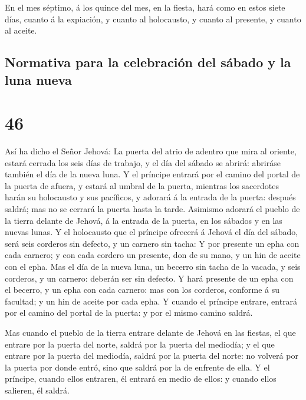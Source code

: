  En el mes séptimo, á los quince del mes, en la fiesta,
hará como en estos siete días, cuanto á la expiación, y cuanto al
holocausto, y cuanto al presente, y cuanto al aceite.

\hypertarget{normativa-para-la-celebraciuxf3n-del-suxe1bado-y-la-luna-nueva}{%
\subsection{Normativa para la celebración del sábado y la luna
nueva}\label{normativa-para-la-celebraciuxf3n-del-suxe1bado-y-la-luna-nueva}}

\hypertarget{section-26-46}{%
\section{46}\label{section-26-46}}

 Así ha dicho el Señor Jehová: La puerta del atrio de
adentro que mira al oriente, estará cerrada los seis días de trabajo, y
el día del sábado se abrirá: abriráse también el día de la nueva luna.
 Y el príncipe entrará por el camino del portal de la
puerta de afuera, y estará al umbral de la puerta, mientras los
sacerdotes harán su holocausto y sus pacíficos, y adorará á la entrada
de la puerta: después saldrá; mas no se cerrará la puerta hasta la
tarde.  Asimismo adorará el pueblo de la tierra delante de
Jehová, á la entrada de la puerta, en los sábados y en las nuevas lunas.
 Y el holocausto que el príncipe ofrecerá á Jehová el día
del sábado, será seis corderos sin defecto, y un carnero sin tacha:
 Y por presente un epha con cada carnero; y con cada
cordero un presente, don de su mano, y un hin de aceite con el epha.
 Mas el día de la nueva luna, un becerro sin tacha de la
vacada, y seis corderos, y un carnero: deberán ser sin defecto.
 Y hará presente de un epha con el becerro, y un epha con
cada carnero: mas con los corderos, conforme á su facultad; y un hin de
aceite por cada epha.  Y cuando el príncipe entrare,
entrará por el camino del portal de la puerta: y por el mismo camino
saldrá.

 Mas cuando el pueblo de la tierra entrare delante de
Jehová en las fiestas, el que entrare por la puerta del norte, saldrá
por la puerta del mediodía; y el que entrare por la puerta del mediodía,
saldrá por la puerta del norte: no volverá por la puerta por donde
entró, sino que saldrá por la de enfrente de ella.  Y el
príncipe, cuando ellos entraren, él entrará en medio de ellos: y cuando
ellos salieren, él saldrá.

